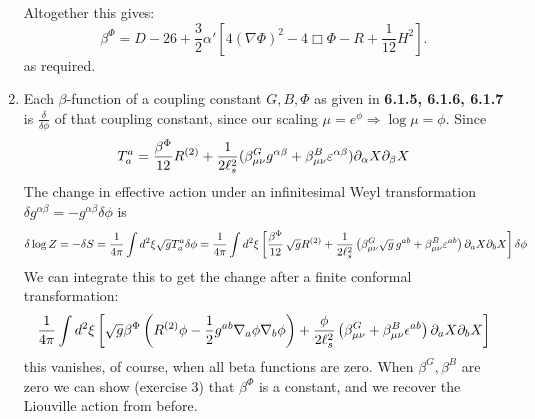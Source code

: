 \documentclass[11pt, class=article, crop=false]{standalone}
\begin{document}
\begin{enumerate}
	Altogether this gives:
	\[
		\beta^\Phi = D - 26 + \frac32 \alpha' \left[4 (\nabla \Phi)^2 - 4 \Box \Phi - R + \frac{1}{12} H^2 \right].
	\]
	as required. 
	
	\item Each $\beta$-function of a coupling constant $G, B, \Phi$ as given in \textbf{6.1.5, 6.1.6, 6.1.7} is $\frac{\delta}{\delta \phi}$ of that coupling constant, since our scaling $\mu = e^{\phi} \Rightarrow \log \mu = \phi$. Since 
	\[
		T^{a}_{a} = \frac{\beta^\Phi}{12} R^{(2)} + \frac{1}{2 \ell_s^2} (\beta_{\mu \nu}^G g^{\alpha \beta} + \beta^{B}_{\mu \nu} \varepsilon^{\alpha \beta}) \partial_\alpha X \partial_\beta X
	\]
	The change in effective action under an infinitesimal Weyl transformation $\delta g^{\alpha \beta} = - g^{\alpha \beta} \delta \phi$ is
	\[
		\delta \log Z = - \delta S = \frac{1}{4\pi} \int d^2 \xi \sqrt g T^a_a \delta \phi = \frac{1}{4\pi} \int d^2 \xi \left[ \frac{\beta^\Phi}{12}\,  \sqrt g R^{(2)} + \frac{1}{2 \ell_s^2} \left(\beta_{\mu \nu}^G  \sqrt g\, g^{a b} + \beta^{B}_{\mu \nu} \varepsilon^{a b}\right) \partial_a X \partial_b X \right] \delta \phi
	\]
	We can integrate this to get the change after a finite conformal transformation:
	\[
		\frac{1}{4\pi} \int d^2 \xi \left[\sqrt g \beta^\Phi \left(R^{(2)} \phi - \frac12 g^{ab} \nabla_a \phi \nabla_b \phi \right) + \frac{\phi }{2\ell_s^2} \left(\beta^G_{\mu \nu} + \beta^B_{\mu \nu} \epsilon^{ab} \right) \partial_a X \partial_b X \right]
	\]
	this vanishes, of course, when all beta functions are zero. When $\beta^G, \beta^B$ are zero we can show (exercise 3) that $\beta^\Phi$ is a constant, and we recover the Liouville action from before. 
	

\end{enumerate}
\end{document}
